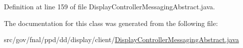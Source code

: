 Definition at line 159 of file Display\-Controller\-Messaging\-Abstract.\-java.



The documentation for this class was generated from the following file\-:\begin{DoxyCompactItemize}
\item 
src/gov/fnal/ppd/dd/display/client/\hyperlink{DisplayControllerMessagingAbstract_8java}{Display\-Controller\-Messaging\-Abstract.\-java}\end{DoxyCompactItemize}
